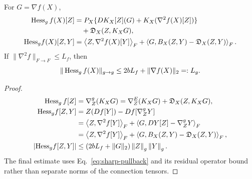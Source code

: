 \begin{theorem}
\label{thm:explicit-hessian}
For $G=\nabla f(X)$,
\begin{align}
\operatorname{Hess}_g f(X)[Z]
&=P_X\{DK_X[Z](G)+K_X(\nabla^2f(X)[Z])\}\notag\\
&\quad+\mathfrak D_X(Z,K_XG),\\
{\rm Hess}_g f(X)[Z,Y]
&=\left\langle Z,\nabla^2f(X)[Y]\right\rangle_F
+\left\langle G,B_X(Z,Y)-\mathfrak D_X(Z,Y)\right\rangle_F .
\label{eq:rigid-hessian-form}
\end{align}
If $\|\nabla^2f\|_{F\to F}\leq L_f$, then
\begin{equation}
\|\operatorname{Hess}_g f(X)\|_{g\to g}
\leq 2bL_f+\|\nabla f(X)\|_2
=:L_g .
\label{eq:rigid-Hessian-bound}
\end{equation}
\end{theorem}
\begin{proof}
\begin{align}
\operatorname{Hess}_g f[Z]
&=\nabla^g_Z(K_XG)
=\nabla^E_Z(K_XG)+\mathfrak D_X(Z,K_XG),\\
{\rm Hess}_g f[Z,Y]
&=Z(Df[Y])-Df[\nabla^g_ZY]\\
&=\left\langle Z,\nabla^2f[Y]\right\rangle_F+\left\langle G,DY[Z]-\nabla^g_ZY\right\rangle_F\\
&=\left\langle Z,\nabla^2f[Y]\right\rangle_F+\left\langle G,B_X(Z,Y)-\mathfrak D_X(Z,Y)\right\rangle_F,\\
|{\rm Hess}_g f[Z,Y]|
&\leq(2bL_f+\|G\|_2)\left\lVert Z\right\rVert_g\left\lVert Y\right\rVert_g .
\end{align}
The final estimate uses Eq.~\eqref{eq:sharp-pullback} and its residual
operator bound rather than separate norms of the connection tensors.
\end{proof}

